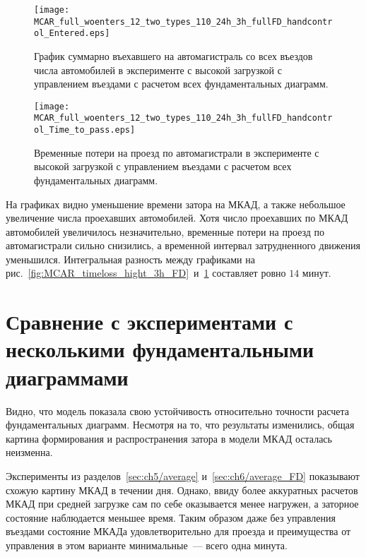 \begin{figure}[ht]
    \begin{minipage}[b][][b]{0.49\textwidth}
        \centering
        \texttt{[image: MCAR\_full\_woenters\_12\_two\_types\_110\_24h\_3h\_fullFD\_handcontrol\_Entered.eps]}
        \caption{График суммарно въехавшего на автомагистраль со всех въездов числа автомобилей в эксперименте с высокой загрузкой с управлением въездами с расчетом всех фундаментальных диаграмм.}
        \label{fig:MCAR_entered_hight_3h_handcontrol_FD}
    \end{minipage}
    \hfill
    \begin{minipage}[b][][b]{0.49\textwidth}
        \centering
        \texttt{[image: MCAR\_full\_woenters\_12\_two\_types\_110\_24h\_3h\_fullFD\_handcontrol\_Time\_to\_pass.eps]}
        \caption{Временные потери на проезд по автомагистрали в эксперименте с высокой загрузкой с управлением въездами с расчетом всех фундаментальных диаграмм.}
        \label{fig:MCAR_timeloss_hight_3h_handcontrol_FD}
    \end{minipage}
\end{figure}

На графиках видно уменьшение времени затора на МКАД, а также небольшое увеличение числа проехавших автомобилей.
Хотя число проехавших по МКАД автомобилей увеличилось незначительно, временные потери на проезд по автомагистрали сильно снизились, а временной интервал затрудненного движения уменьшился.
Интегральная разность между графиками на рис.~\ref{fig:MCAR_timeloss_hight_3h_FD}~и~\ref{fig:MCAR_timeloss_hight_3h_handcontrol_FD} составляет ровно \(14\) минут.


\section{Сравнение с экспериментами с несколькими фундаментальными диаграммами}
Видно, что модель показала свою устойчивость относительно точности расчета фундаментальных диаграмм.
Несмотря на то, что результаты изменились, общая картина формирования и распространения затора в модели МКАД осталась неизменна.

Эксперименты из разделов~\ref{sec:ch5/average} и~\ref{sec:ch6/average_FD} показывают схожую картину МКАД в течении дня.
Однако, ввиду более аккуратных расчетов МКАД при средней загрузке сам по себе оказывается менее нагружен, а заторное состояние наблюдается меньшее время.
Таким образом даже без управления въездами состояние МКАДа удовлетворительно для проезда и преимущества от управления в этом варианте минимальные~--- всего одна минута.

